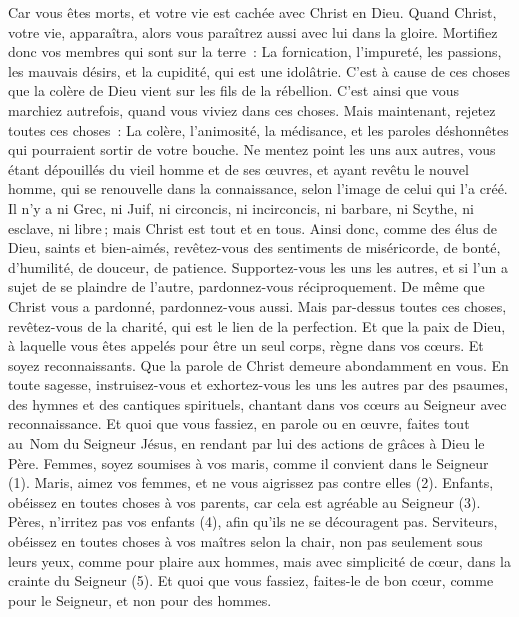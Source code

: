 \begin{multicols}{2}
Car vous êtes morts, et votre vie est cachée avec Christ en Dieu.
Quand Christ, votre vie, apparaîtra, alors vous paraîtrez aussi avec lui dans la gloire.
Mortifiez donc vos membres qui sont sur la terre : La fornication, l’impureté, les passions, les mauvais désirs, et la cupidité, qui est une idolâtrie.
C’est à cause de ces choses que la colère de Dieu vient sur les fils de la rébellion.
C’est ainsi que vous marchiez autrefois, quand vous viviez dans ces choses.
Mais maintenant, rejetez toutes ces choses : La colère, l'animosité, la médisance, et les paroles déshonnêtes qui pourraient sortir de votre bouche.
Ne mentez point les uns aux autres, vous étant dépouillés du vieil homme et de ses œuvres,
et ayant revêtu le nouvel homme, qui se renouvelle dans la connaissance, selon l'image de celui qui l'a créé.
Il n'y a ni Grec, ni Juif, ni circoncis, ni incirconcis, ni barbare, ni Scythe, ni esclave, ni libre ; mais Christ est tout et en tous.
Ainsi donc, comme des élus de Dieu, saints et bien-aimés, revêtez-vous des sentiments de miséricorde, de bonté, d'humilité, de douceur, de patience.
Supportez-vous les uns les autres, et si l’un a sujet de se plaindre de l’autre, pardonnez-vous réciproquement. De même que Christ vous a pardonné, pardonnez-vous aussi.
Mais par-dessus toutes ces choses, revêtez-vous de la charité, qui est le lien de la perfection.
Et que la paix de Dieu, à laquelle vous êtes appelés pour être un seul corps, règne dans vos cœurs. Et soyez reconnaissants.
Que la parole de Christ demeure abondamment en vous. En toute sagesse, instruisez-vous et exhortez-vous les uns les autres par des psaumes, des hymnes et des cantiques spirituels, chantant dans vos cœurs au Seigneur avec reconnaissance.
Et quoi que vous fassiez, en parole ou en œuvre, faites tout au Nom du Seigneur Jésus, en rendant par lui des actions de grâces à Dieu le Père.
Femmes, soyez soumises à vos maris, comme il convient dans le Seigneur (1).
Maris, aimez vos femmes, et ne vous aigrissez pas contre elles (2).
Enfants, obéissez en toutes choses à vos parents, car cela est agréable au Seigneur (3).
Pères, n'irritez pas vos enfants (4), afin qu'ils ne se découragent pas.
Serviteurs, obéissez en toutes choses à vos maîtres selon la chair, non pas seulement sous leurs yeux, comme pour plaire aux hommes, mais avec simplicité de cœur, dans la crainte du Seigneur (5).
Et quoi que vous fassiez, faites-le de bon cœur, comme pour le Seigneur, et non pour des hommes.

\end{multicols}
